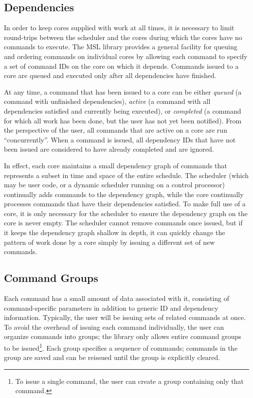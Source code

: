 \subsection{Dependencies}

In order to keep cores supplied with work at all times, it is
necessary to limit round-trips between the scheduler and the cores
during which the cores have no commands to execute. The MSL library
provides a general facility for queuing and ordering commands on
individual cores by allowing each command to specify a set of command
IDs on the core on which it depends. Commands issued to a core are
queued and executed only after all dependencies have finished.

At any time, a command that has been issued to a core can be either
\emph{queued} (a command with unfinished dependencies), \emph{active}
(a command with all dependencies satisfied and currently being
executed), or \emph{completed} (a command for which all work has been
done, but the user has not yet been notified). From the perspective of
the user, all commands that are active on a core are run
``concurrently''. When a command is issued, all dependency IDs that
have not been issued are considered to have already completed and are
ignored.

In effect, each core maintains a small dependency graph of commands
that represents a subset in time and space of the entire
schedule. The scheduler (which may be
user code, or a dynamic scheduler running on a control processor)
continually adds commands to the dependency graph, while the core
continually processes commands that have their dependencies
satisfied. To make full use of a core, it is only necessary for the
scheduler to ensure the dependency graph on the core is never
empty. The scheduler cannot remove commands once issued, but if it
keeps the dependency graph shallow in depth, it can quickly change the
pattern of work done by a core simply by issuing a different set of
new commands.

\subsection{Command Groups}

Each command has a small amount of data associated with it, consisting
of command-specific parameters in addition to generic ID and
dependency information. Typically, the user will be issuing sets of
related commands at once. To avoid the overhead of issuing each
command individually, the user can organize commands into groups; the
library only allows entire command groups to be issued\footnote{To
issue a single command, the user can create a group containing only
that command.}. Each group specifies a sequence of commands; commands
in the group are saved and can be reissued until the group is
explicitly cleared.

